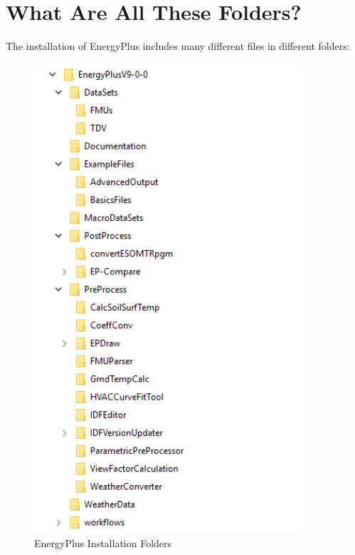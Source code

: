 \section{What Are All These Folders?}

The installation of EnergyPlus includes many different files in different
folders:

\begin{figure}[hbtp] 
\centering
\includegraphics[width=0.9\textwidth, height=0.9\textheight, keepaspectratio=true]{media/energyplusfolder.png}
\caption{EnergyPlus Installation Folders}
\end{figure}

